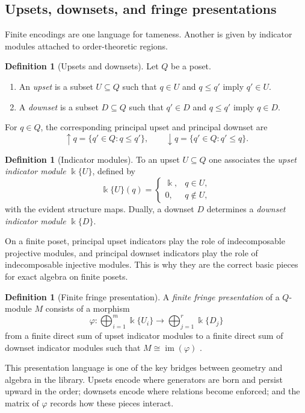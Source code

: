 \documentclass[11pt]{article}
\newcommand{\kk}{\Bbbk}
\theoremstyle{definition}
\newtheorem{defn}[theorem]{Definition}
\theoremstyle{remark}
\begin{document}
\subsection{Upsets, downsets, and fringe presentations}

Finite encodings are one language for tameness. Another is given by indicator modules attached to order-theoretic regions.

\begin{defn}[Upsets and downsets]
Let $Q$ be a poset.
\begin{enumerate}[label=(\roman*)]
    \item An \emph{upset} is a subset $U \subseteq Q$ such that $q \in U$ and $q \leq q'$ imply $q' \in U$.
    \item A \emph{downset} is a subset $D \subseteq Q$ such that $q' \in D$ and $q \leq q'$ imply $q \in D$.
\end{enumerate}
For $q \in Q$, the corresponding principal upset and principal downset are
\[
\uparrow q = \{q' \in Q : q \leq q'\}, \qquad
\downarrow q = \{q' \in Q : q' \leq q\}.
\]
\end{defn}

\begin{defn}[Indicator modules]
To an upset $U \subseteq Q$ one associates the \emph{upset indicator module} $\kk\{U\}$, defined by
\[
\kk\{U\}(q)=
\begin{cases}
\kk, & q \in U,\\
0, & q \notin U,
\end{cases}
\]
with the evident structure maps. Dually, a downset $D$ determines a \emph{downset indicator module} $\kk\{D\}$.
\end{defn}

On a finite poset, principal upset indicators play the role of indecomposable projective modules, and principal downset indicators play the role of indecomposable injective modules. This is why they are the correct basic pieces for exact algebra on finite posets.

\begin{defn}[Finite fringe presentation]
A \emph{finite fringe presentation} of a $Q$-module $M$ consists of a morphism
\[
\varphi : \bigoplus_{i=1}^m \kk\{U_i\} \longrightarrow \bigoplus_{j=1}^r \kk\{D_j\}
\]
from a finite direct sum of upset indicator modules to a finite direct sum of downset indicator modules such that $M \cong \operatorname{im}(\varphi)$ \cite{Mil20}.
\end{defn}

This presentation language is one of the key bridges between geometry and algebra in the library. Upsets encode where generators are born and persist upward in the order; downsets encode where relations become enforced; and the matrix of $\varphi$ records how these pieces interact.
\end{document}
